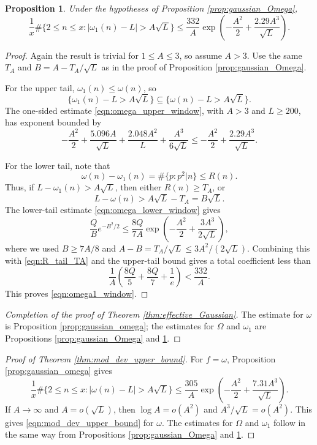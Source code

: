 \documentclass[12pt,a4paper,reqno]{amsart}
\theoremstyle{plain}
\newtheorem{prpstn}[thrm]{Proposition}
\numberwithin{sblmm}{thrm}
\numberwithin{equation}{section}
\begin{document}
\begin{prpstn}\label{prop:gaussian_omega1}
    Under the hypotheses of Proposition \ref{prop:gaussian_Omega},
    \begin{equation}\label{eqn:omega1_window}
        \frac{1}{x}\#\{2\le n\le x:|\omega_1(n)-L|>A\sqrt{L}\}\le\frac{332}{A}\exp\left(-\frac{A^2}{2}+\frac{2.29A^3}{\sqrt{L}}\right).
    \end{equation}
\end{prpstn}
\begin{proof}
    Again the result is trivial for $1\le A\le 3$, so assume $A>3$. Use the same $T_A$ and $B=A-T_A/\sqrt{L}$ as in the proof of Proposition \ref{prop:gaussian_Omega}.

    For the upper tail, $\omega_1(n)\le\omega(n)$, so
    $$\{\omega_1(n)-L>A\sqrt{L}\}\subseteq\{\omega(n)-L>A\sqrt{L}\}.$$
    The one-sided estimate \eqref{eqn:omega_upper_window}, with $A>3$ and $L\ge 200$, has exponent bounded by
    $$-\frac{A^2}{2}+\frac{5.096A}{\sqrt{L}}+\frac{2.048A^2}{L}+\frac{A^3}{6\sqrt{L}}\le -\frac{A^2}{2}+\frac{2.29A^3}{\sqrt{L}}.$$

    For the lower tail, note that
    $$\omega(n)-\omega_1(n)=\#\{p:p^2|n\}\le R(n).$$
    Thus, if $L-\omega_1(n)>A\sqrt{L}$, then either $R(n)\ge T_A$, or
    $$L-\omega(n)>A\sqrt{L}-T_A=B\sqrt{L}.$$
    The lower-tail estimate \eqref{eqn:omega_lower_window} gives
    $$\frac{Q}{B}e^{-B^2/2}\le\frac{8Q}{7A}\exp\left(-\frac{A^2}{2}+\frac{3A^3}{2\sqrt{L}}\right),$$
    where we used $B\ge 7A/8$ and $A-B=T_A/\sqrt{L}\le 3A^2/(2\sqrt{L})$. Combining this with \eqref{eqn:R_tail_TA} and the upper-tail bound gives a total coefficient less than
    $$\frac{1}{A}\left(\frac{8Q}{5}+\frac{8Q}{7}+\frac{1}{e}\right)<\frac{332}{A}.$$
    This proves \eqref{eqn:omega1_window}.
\end{proof}

\begin{proof}[Completion of the proof of Theorem \ref{thm:effective_Gaussian}]
    The estimate for $\omega$ is Proposition \ref{prop:gaussian_omega}; the estimates for $\Omega$ and $\omega_1$ are Propositions \ref{prop:gaussian_Omega} and \ref{prop:gaussian_omega1}.
\end{proof}

\begin{proof}[Proof of Theorem \ref{thm:mod_dev_upper_bound}]
    For $f=\omega$, Proposition \ref{prop:gaussian_omega} gives
    $$\frac{1}{x}\#\{2\le n\le x:|\omega(n)-L|>A\sqrt{L}\}\le\frac{305}{A}\exp\left(-\frac{A^2}{2}+\frac{7.31A^3}{\sqrt{L}}\right).$$
    If $A\to\infty$ and $A=o(\sqrt{L})$, then $\log A=o(A^2)$ and $A^3/\sqrt{L}=o(A^2)$. This gives \eqref{eqn:mod_dev_upper_bound} for $\omega$. The estimates for $\Omega$ and $\omega_1$ follow in the same way from Propositions \ref{prop:gaussian_Omega} and \ref{prop:gaussian_omega1}.
\end{proof}
\end{document}
